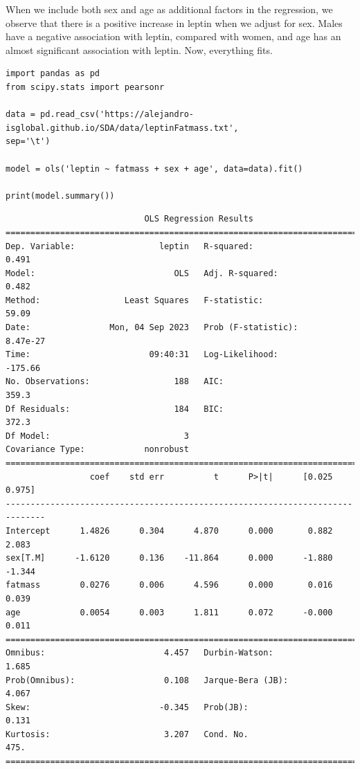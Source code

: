 \documentclass[
]{book}
\begin{document}
When we include both sex and age as additional factors in the regression, we observe that there is a positive increase in leptin when we adjust for sex. Males have a negative association with leptin, compared with women, and age has an almost significant association with leptin. Now, everything fits.

\begin{verbatim}
import pandas as pd
from scipy.stats import pearsonr

data = pd.read_csv('https://alejandro-isglobal.github.io/SDA/data/leptinFatmass.txt', 
sep='\t')

model = ols('leptin ~ fatmass + sex + age', data=data).fit()

print(model.summary())
\end{verbatim}

\begin{verbatim}
                            OLS Regression Results                            
==============================================================================
Dep. Variable:                 leptin   R-squared:                       0.491
Model:                            OLS   Adj. R-squared:                  0.482
Method:                 Least Squares   F-statistic:                     59.09
Date:                Mon, 04 Sep 2023   Prob (F-statistic):           8.47e-27
Time:                        09:40:31   Log-Likelihood:                -175.66
No. Observations:                 188   AIC:                             359.3
Df Residuals:                     184   BIC:                             372.3
Df Model:                           3                                         
Covariance Type:            nonrobust                                         
==============================================================================
                 coef    std err          t      P>|t|      [0.025      0.975]
------------------------------------------------------------------------------
Intercept      1.4826      0.304      4.870      0.000       0.882       2.083
sex[T.M]      -1.6120      0.136    -11.864      0.000      -1.880      -1.344
fatmass        0.0276      0.006      4.596      0.000       0.016       0.039
age            0.0054      0.003      1.811      0.072      -0.000       0.011
==============================================================================
Omnibus:                        4.457   Durbin-Watson:                   1.685
Prob(Omnibus):                  0.108   Jarque-Bera (JB):                4.067
Skew:                          -0.345   Prob(JB):                        0.131
Kurtosis:                       3.207   Cond. No.                         475.
==============================================================================
\end{verbatim}
\end{document}
